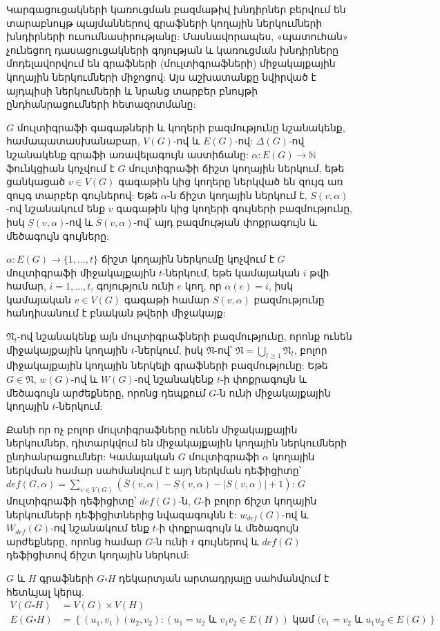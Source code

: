 Կարգացուցակների կառուցման բազմաթիվ խնդիրներ բերվում են տարաբնույթ պայմաններով գրաֆների կողային ներկումների խնդիրների ուսումնասիրությանը: Մասնավորապես, «պատուհան» չունեցող դասացուցակների գոյության և կառուցման խնդիրները մոդելավորվում են գրաֆների (մուլտիգրաֆների) միջակայքային կողային ներկումների միջոցով: Այս աշխատանքը նվիրված է այդպիսի ներկումների և նրանց տարբեր բնույթի ընդհանրացումների հետազոտմանը: 

$G$ մուլտիգրաֆի գագաթների և կողերի բազմությունը նշանակենք, համապատասխանաբար, $V(G)$-ով և $E(G)$-ով: $\Delta(G)$-ով նշանակենք գրաֆի առավելագույն աստիճանը: $\alpha : E(G) \rightarrow \mathbb{N}$ ֆունկցիան կոչվում է $G$ մուլտիգրաֆի ճիշտ կողային ներկում, եթե ցանկացած $v\in V(G)$ գագաթին կից կողերը ներկված են զույգ առ զույգ տարբեր գույներով: Եթե $\alpha$-ն ճիշտ կողային ներկում է, $S(v,\alpha)$-ով նշանակում ենք $v$ գագաթին կից կողերի գույների բազմությունը, իսկ $\underline{S}(v, \alpha)$-ով և $\overline{S}(v, \alpha)$-ով՝ այդ բազմության փոքրագույն և մեծագույն գույները:
    
$\alpha : E(G) \rightarrow \{1,\ldots,t\}$ ճիշտ կողային ներկումը կոչվում է $G$ մուլտիգրաֆի միջակայքային $t$-ներկում, եթե կամայական $i$ թվի համար, $i=1,\ldots,t$, գոյություն ունի $e$ կող, որ $\alpha(e)=i$, իսկ կամայական $v \in V(G)$ գագաթի համար $S(v,\alpha)$ բազմությունը հանդիսանում է բնական թվերի միջակայք:

$\mathfrak{N}_t$-ով նշանակենք այն մուլտիգրաֆների բազմությունը, որոնք ունեն միջակայքային կողային $t$-ներկում, իսկ $\mathfrak{N}$-ով՝ $\mathfrak{N} = \bigcup\limits_{t \geq 1}{\mathfrak{N}_t}$, բոլոր միջակայքային կողային ներկելի գրաֆների բազմությունը: Եթե $G \in \mathfrak{N}$, $w(G)$-ով և $W(G)$-ով նշանակենք $t$-ի փոքրագույն և մեծագույն արժեքները, որոնց դեպքում $G$-ն ունի միջակայքային կողային $t$-ներկում:

Քանի որ ոչ բոլոր մուլտիգրաֆները ունեն միջակայքային ներկումներ, դիտարկվում են միջակայքային կողային ներկումների ընդհանրացումներ: Կամայական $G$ մուլտիգրաֆի $\alpha$ կողային ներկման համար սահմանվում է այդ ներկման դեֆիցիտը՝ $def(G, \alpha) = \sum\limits_{v\in V(G)}{\left(\overline{S}(v,\alpha)-\underline{S}(v,\alpha) - |S(v,\alpha)|+1\right)}$: $G$ մուլտիգրաֆի դեֆիցիտը՝ $def(G)$-ն, $G$-ի բոլոր ճիշտ կողային ներկումների դեֆիցիտներից նվազագույնն է: $w_{def}(G)$-ով և $W_{def}(G)$-ով նշանակում ենք $t$-ի փոքրագույն և մեծագույն արժեքները, որոնց համար $G$-ն ունի $t$ գույներով և $def(G)$ դեֆիցիտով ճիշտ կողային ներկում: 

$G$ և $H$ գրաֆների $G\square H$ դեկարտյան արտադրյալը սահմանվում է հետևյալ կերպ.
\begin{align*}
V(G \square H) &= V(G) \times V(H) \\
E(G \square H) &= \left\{(u_1,v_1)(u_2,v_2) : (u_1=u_2 \text{ և } v_1v_2 \in E(H)) \text{ կամ } (v_1=v_2 \text{ և } u_1u_2 \in E(G) \right\}
\end{align*}

